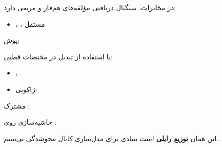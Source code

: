 

در مخابرات، سیگنال دریافتی مؤلفه‌های هم‌فاز  و مربعی  دارد:

\begin{itemize}
\tightlist
\item
  ، ، مستقل
\end{itemize}

پوش: 

با استفاده از تبدیل  در مختصات قطبی:

\begin{itemize}
\tightlist
\item
  ، 
\item
  ژاکوبی: 
\end{itemize}

 مشترک :\PSbr{}

حاشیه‌سازی روی \lr{$\theta \in [0,\, 2\pi)$}:


این همان \textbf{توزیع رایلی} است  بنیادی برای مدل‌سازی کانال محوشدگی بی‌سیم.


